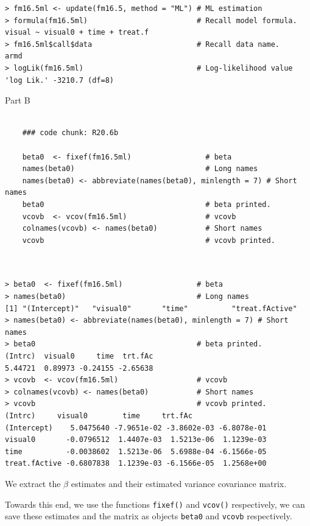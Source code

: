 \documentclass[a4paper,12pt]{article}
\begin{document}
\begin{verbatim}
> fm16.5ml <- update(fm16.5, method = "ML") # ML estimation
> formula(fm16.5ml)                         # Recall model formula.
visual ~ visual0 + time + treat.f
> fm16.5ml$call$data                        # Recall data name.
armd
> logLik(fm16.5ml)                          # Log-likelihood value
'log Lik.' -3210.7 (df=8)
\end{verbatim}


Part B


\begin{framed}
	\begin{verbatim}

	### code chunk: R20.6b

	beta0  <- fixef(fm16.5ml)                 # beta
	names(beta0)                              # Long names
	names(beta0) <- abbreviate(names(beta0), minlength = 7) # Short names 
	beta0                                     # beta printed.
	vcovb  <- vcov(fm16.5ml)                  # vcovb 
	colnames(vcovb) <- names(beta0)           # Short names
	vcovb                                     # vcovb printed. 
	
	
	\end{verbatim}
\end{framed}

\begin{verbatim}
> beta0  <- fixef(fm16.5ml)                 # beta
> names(beta0)                              # Long names
[1] "(Intercept)"   "visual0"       "time"          "treat.fActive"
> names(beta0) <- abbreviate(names(beta0), minlength = 7) # Short names 
> beta0                                     # beta printed.
(Intrc)  visual0     time  trt.fAc 
5.44721  0.89973 -0.24155 -2.65638 
> vcovb  <- vcov(fm16.5ml)                  # vcovb 
> colnames(vcovb) <- names(beta0)           # Short names
> vcovb                                     # vcovb printed. 
(Intrc)     visual0        time     trt.fAc
(Intercept)    5.0475640 -7.9651e-02 -3.8602e-03 -6.8078e-01
visual0       -0.0796512  1.4407e-03  1.5213e-06  1.1239e-03
time          -0.0038602  1.5213e-06  5.6988e-04 -6.1566e-05
treat.fActive -0.6807838  1.1239e-03 -6.1566e-05  1.2568e+00
\end{verbatim}
\newpage

We extract the \textbf{$\beta$} estimates and their estimated variance covariance matrix.

Towards this end, we use the functions \texttt{fixef()} and \texttt{vcov()} respectively, we can save these estimates and the matrix as objects \texttt{beta0} and 
\texttt{vcovb} respectively.
\end{document}

